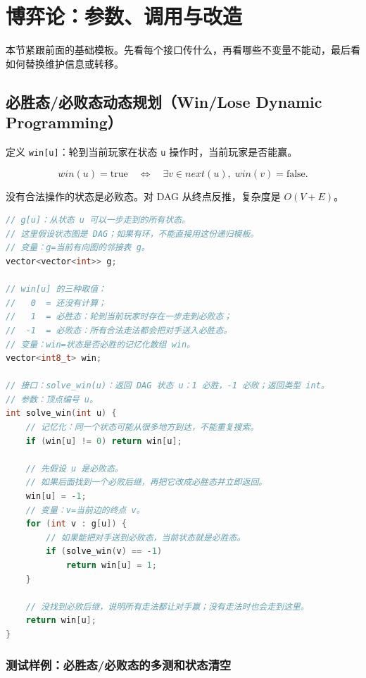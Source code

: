 \section{博弈论：参数、调用与改造}

本节紧跟前面的基础模板。先看每个接口传什么，再看哪些不变量不能动，最后看如何替换维护信息或转移。

\subsection{必胜态/必败态动态规划（Win/Lose Dynamic Programming）}

定义 \passthrough{\lstinline!win[u]!}：轮到当前玩家在状态 \passthrough{\lstinline!u!} 操作时，当前玩家是否能赢。

\[
win(u)=\text{true}\quad\Longleftrightarrow\quad
\exists v\in next(u),\; win(v)=\text{false}.
\]

没有合法操作的状态是必败态。对 DAG 从终点反推，复杂度是 \(O(V+E)\)。

\begin{lstlisting}[language={C++}]
// g[u]：从状态 u 可以一步走到的所有状态。
// 这里假设状态图是 DAG；如果有环，不能直接用这份递归模板。
// 变量：g=当前有向图的邻接表 g。
vector<vector<int>> g;

// win[u] 的三种取值：
//   0  = 还没有计算；
//   1  = 必胜态：轮到当前玩家时存在一步走到必败态；
//  -1  = 必败态：所有合法走法都会把对手送入必胜态。
// 变量：win=状态是否必胜的记忆化数组 win。
vector<int8_t> win;

// 接口：solve_win(u)：返回 DAG 状态 u：1 必胜，-1 必败；返回类型 int。
// 参数：顶点编号 u。
int solve_win(int u) {
    // 记忆化：同一个状态可能从很多地方到达，不能重复搜索。
    if (win[u] != 0) return win[u];

    // 先假设 u 是必败态。
    // 如果后面找到一个必败后继，再把它改成必胜态并立即返回。
    win[u] = -1;
    // 变量：v=当前边的终点 v。
    for (int v : g[u]) {
        // 如果能把对手送到必败态，当前状态就是必胜态。
        if (solve_win(v) == -1)
            return win[u] = 1;
    }

    // 没找到必败后继，说明所有走法都让对手赢；没有走法时也会走到这里。
    return win[u];
}
\end{lstlisting}

\subsubsection{测试样例：必胜态/必败态的多测和状态清空}

